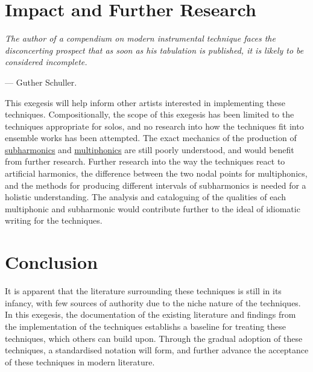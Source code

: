 \section{Impact and Further Research}
\emph{The author of a compendium on modern instrumental technique faces the disconcerting prospect that as soon as his tabulation is published, it is likely to be considered incomplete.}
\begin{flushright}
    --- Guther Schuller.\autocite[vii]{readCompendiumModernInstrumental1993}
\end{flushright}
This exegesis will help inform other artists interested in implementing these techniques. 
Compositionally, the scope of this exegesis has been limited to the techniques appropriate for solos, and no research into how the techniques fit into ensemble works has been attempted.
The exact mechanics of the production of \hyperref[sec:subharmonics]{subharmonics} and \hyperref[sec:multiphonics]{multiphonics} are still poorly understood, and would benefit from further research.
Further research into the way the techniques react to artificial harmonics, the difference between the two nodal points for multiphonics, and the methods for producing different intervals of subharmonics is needed for a holistic understanding.
The analysis and cataloguing of the qualities of each multiphonic and subharmonic would contribute further to the ideal of idiomatic writing for the techniques.


\section{Conclusion}

It is apparent that the literature surrounding these techniques is still in its infancy, with few sources of authority due to the niche nature of the techniques.
In this exegesis, the documentation of the existing literature and findings from the implementation of the techniques establishs a baseline for treating these techniques, which others can build upon.
Through the gradual adoption of these techniques, a standardised notation will form, and further advance the acceptance of these techniques in modern literature.

